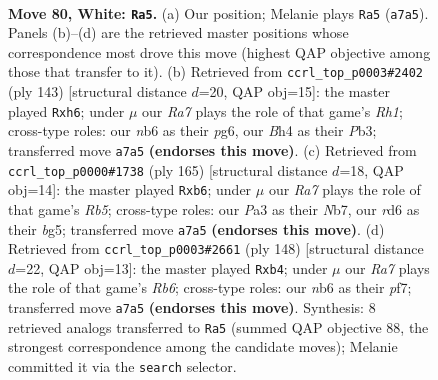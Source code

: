 \documentclass[11pt]{article}
\begin{document}
\clearpage

\begin{figure}[p]\centering
\begin{subfigure}{0.46\textwidth}\centering
\resizebox{\linewidth}{!}{%
\newchessgame
\chessboard[
  setfen={6k1/R7/1n1r4/8/p4P1B/P6P/7K/8 w - - 15 80},
  showmover=false,
  pgfstyle=straightmove, color=movearrow, markmove={a7-a5}
]}
\caption{}
\end{subfigure}\hfill
\begin{subfigure}{0.46\textwidth}\centering
\resizebox{\linewidth}{!}{%
\newchessgame
\chessboard[
  setfen={7r/8/5RPP/8/2pk4/1p4K1/8/8 b - - 0 72},
  showmover=false,
  pgfstyle=straightmove, color=movearrow, markmove={h8-h6}
]}
\caption{}
\end{subfigure}
\\[4pt]
\begin{subfigure}{0.46\textwidth}\centering
\resizebox{\linewidth}{!}{%
\newchessgame
\chessboard[
  setfen={8/1n5p/1P6/3pk1B1/1r6/2R4P/4K3/8 b - - 0 83},
  showmover=false,
  pgfstyle=straightmove, color=movearrow, markmove={b4-b6}
]}
\caption{}
\end{subfigure}\hfill
\begin{subfigure}{0.46\textwidth}\centering
\resizebox{\linewidth}{!}{%
\newchessgame
\chessboard[
  setfen={8/r3kp2/1R6/3P4/1pp1K3/8/5P2/8 w - - 0 75},
  showmover=false,
  pgfstyle=straightmove, color=movearrow, markmove={b6-b4}
]}
\caption{}
\end{subfigure}
\caption{\textbf{Move 80, White: \texttt{Ra5}.} (a) Our position; Melanie plays \texttt{Ra5} (\texttt{a7a5}). Panels (b)--(d) are the retrieved master positions whose correspondence most drove this move (highest QAP objective among those that transfer to it). (b) Retrieved from \texttt{ccrl\_top\_p0003\#2402} (ply 143) [structural distance $d$=20, QAP obj=15]: the master played \texttt{Rxh6}; under $\mu$ our \emph{Ra7} plays the role of that game's \emph{Rh1}; cross-type roles: our \emph{n}b6 as their \emph{p}g6, our \emph{B}h4 as their \emph{P}b3; transferred move \texttt{a7a5} \textbf{(endorses this move)}. (c) Retrieved from \texttt{ccrl\_top\_p0000\#1738} (ply 165) [structural distance $d$=18, QAP obj=14]: the master played \texttt{Rxb6}; under $\mu$ our \emph{Ra7} plays the role of that game's \emph{Rb5}; cross-type roles: our \emph{P}a3 as their \emph{N}b7, our \emph{r}d6 as their \emph{b}g5; transferred move \texttt{a7a5} \textbf{(endorses this move)}. (d) Retrieved from \texttt{ccrl\_top\_p0003\#2661} (ply 148) [structural distance $d$=22, QAP obj=13]: the master played \texttt{Rxb4}; under $\mu$ our \emph{Ra7} plays the role of that game's \emph{Rb6}; cross-type roles: our \emph{n}b6 as their \emph{p}f7; transferred move \texttt{a7a5} \textbf{(endorses this move)}. Synthesis: 8 retrieved analogs transferred to \texttt{Ra5} (summed QAP objective 88, the strongest correspondence among the candidate moves); Melanie committed it via the \texttt{search} selector.}
\label{fig:thought-m158}
\end{figure}
\end{document}
